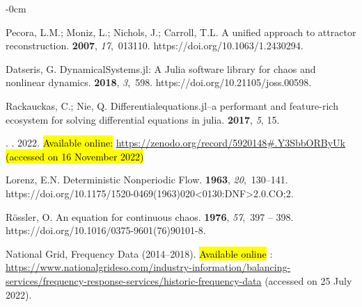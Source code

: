 \documentclass[entropy,article,accept,pdftex,moreauthors]{Definitions/mdpi}
\begin{document}
\begin{adjustwidth}{-\extralength}{0cm}
\begin{thebibliography}{999}
Pecora, L.M.; Moniz, L.; Nichols, J.; Carroll, T.L.
\newblock A unified approach to attractor reconstruction.
 {\bf
  2007}, {\em 17},~013110.
\newblock
  {https://doi.org/10.1063/1.2430294}.

Datseris, G.
\newblock DynamicalSystems.jl: A Julia software library for chaos and nonlinear
  dynamics.
 {\bf 2018}, {\em 3},~598.
\newblock
  {https://doi.org/10.21105/joss.00598}.

Rackauckas, C.; Nie, Q.
\newblock Differentialequations.jl--a performant and feature-rich ecosystem for
  solving differential equations in julia.
 {\bf 2017}, {\em 5}, 15.

.
. {2022}.
\newblock
   \hl{Available online:} %
 \url{https://zenodo.org/record/5920148\#.Y3SbbORByUk} \hl{(accessed on 16 November 2022)} %


Lorenz, E.N.
\newblock Deterministic Nonperiodic Flow.
 {\bf 1963}, {\em
  20},~130--141.
\newblock
  {https://doi.org/10.1175/1520-0469(1963)020<0130:DNF>2.0.CO;2}.

Rössler, O.
\newblock An equation for continuous chaos.
 {\bf 1976}, {\em 57},~397 -- 398.
\newblock
  {https://doi.org/10.1016/0375-9601(76)90101-8}.

National Grid, Frequency Data (2014–2018).
\newblock  \hl{Available online}%
: 
\url{https://www.nationalgrideso.com/industry-information/balancing-services/frequency-response-services/historic-frequency-data} (accessed on 25 July 2022).


\end{thebibliography}
\end{adjustwidth}
\end{document}
